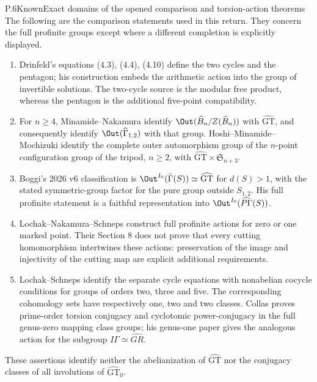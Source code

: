 \begin{statement}{P.6}{Known}{Exact domains of the opened comparison and torsion-action theorems}
The following are the comparison statements used in this return.
They concern the full profinite groups except where a different
completion is explicitly displayed.
\begin{enumerate}[label=(\roman*)]
\item Drinfeld's equations (4.3), (4.4), (4.10) define the
two cycles and the pentagon; his construction embeds the
arithmetic action into the group of invertible solutions.
The two-cycle source is the modular free product, whereas
the pentagon is the additional five-point compatibility.
\item For $n\geq4$, Minamide--Nakamura identify
$\Out(\widehat B_n/Z(\widehat B_n))$ with
$\widehat{\mathrm{GT}}$, and consequently identify
$\Out(\widehat\Gamma_{1,2})$ with that group.
Hoshi--Minamide--Mochizuki identify the complete outer
automorphism group of the $n$-point configuration group
of the tripod, $n\geq2$, with
$\widehat{\mathrm{GT}}\times\mathfrak S_{n+3}$.
\item Boggi's 2026 v6 classification is
$\Out^{I_0}(\check\Gamma(S))\simeq\widehat{\mathrm{GT}}$
for $d(S)>1$, with the stated symmetric-group factor for
the pure group outside $S_{1,2}$. His full profinite
statement is a faithful representation into
$\Out^{I_0}(\widehat{P\Gamma}(S))$.
\item Lochak--Nakamura--Schneps construct full profinite
actions for zero or one marked point. Their Section 8
does not prove that every cutting homomorphism intertwines
these actions: preservation of the image and injectivity
of the cutting map are explicit additional requirements.
\item Lochak--Schneps identify the separate cycle equations
with nonabelian cocycle conditions for groups of orders
two, three and five. The corresponding cohomology sets
have respectively one, two and two classes. Collas proves
prime-order torsion conjugacy and cyclotomic power-conjugacy
in the full genus-zero mapping class groups; his genus-one
paper gives the analogous action for the subgroup
$I\Gamma\simeq\widehat{GR}$.
\end{enumerate}
These assertions identify neither the abelianization of
$\widehat{\mathrm{GT}}$ nor the conjugacy classes of all
involutions of $\widehat{\mathrm{GT}}_0$.
\end{statement}
